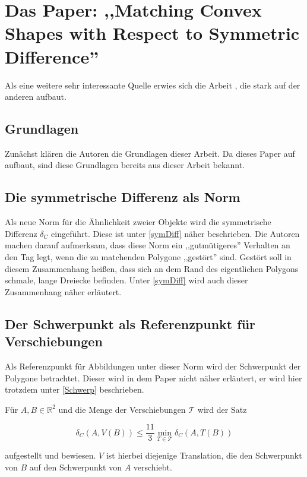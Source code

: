 \section[Matching Shapes with Symmetric Difference]{Das Paper: ,,Matching Convex Shapes with Respect to Symmetric Difference'' }\label{AFRWW}

Als eine weitere sehr interessante Quelle erwies sich die Arbeit \cite{AFRW}, die stark auf der anderen aufbaut. 

\subsection{Grundlagen}

Zunächst klären die Autoren die Grundlagen dieser Arbeit. Da dieses Paper auf \cite{AAR} aufbaut, sind diese Grundlagen bereits aus dieser Arbeit bekannt. 

\subsection{Die symmetrische Differenz als Norm}

Als neue Norm für die Ähnlichkeit zweier Objekte wird die symmetrische Differenz $\delta_C$ eingeführt. Diese ist unter  \vref{symDiff} näher beschrieben. Die Autoren machen darauf aufmerksam, dass diese Norm ein ,,gutmütigeres'' Verhalten an den Tag legt, wenn die zu matchenden Polygone ,,gestört'' sind. Gestört soll in diesem Zusammenhang heißen, dass  sich an dem Rand des eigentlichen Polygons schmale, lange Dreiecke befinden. Unter \vref{symDiff} wird auch dieser Zusammenhang näher erläutert.

\subsection{Der Schwerpunkt als Referenzpunkt für Verschiebungen}

Als Referenzpunkt für Abbildungen unter dieser Norm wird der Schwerpunkt der Polygone betrachtet. Dieser wird in dem Paper  nicht näher erläutert, er wird hier trotzdem unter \vref{Schwerp} beschrieben. 

Für $A, B \in \mathbb{R}^2$ und  die Menge der Verschiebungen $\mathcal{T}$ wird der Satz

$$\delta_C (A,V(B))\leq\frac{11}{3}\min_{T\in\mathcal{T}}\delta_C(A,T(B))$$


aufgestellt und bewiesen. $V$ ist hierbei diejenige Translation, die den Schwerpunkt von $B$ auf den Schwerpunkt von $A$ verschiebt.

